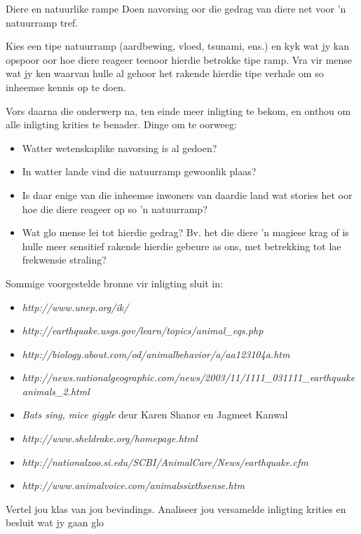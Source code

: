 \begin{project}{Diere en natuurlike rampe}
Doen navorsing oor die gedrag van diere net voor 'n natuurramp tref. \par 
Kies een tipe natuurramp (aardbewing, vloed, tsunami, ens.) en kyk wat jy kan opspoor oor hoe diere reageer teenoor hierdie betrokke tipe ramp. Vra vir mense wat jy ken waarvan hulle al gehoor het rakende hierdie tipe verhale om so inheemse kennis op te doen.\par 
Vors daarna die onderwerp na, ten einde meer inligting te bekom, en onthou om alle inligting krities te benader. Dinge om te oorweeg: \par 
\begin{itemize}[noitemsep]
    \item Watter wetenskaplike navorsing is al gedoen?   
    \item In watter lande vind die natuurramp gewoonlik plaas? 
    \item Is daar enige van die inheemse inwoners van daardie land wat stories het oor hoe die diere reageer op so 'n natuurramp?  
    \item Wat glo mense lei tot hierdie gedrag? Bv. het die diere 'n magiese krag of is hulle meer sensitief rakende hierdie gebeure as ons, met betrekking tot lae frekwensie straling? 
\end{itemize}
Sommige voorgestelde bronne vir inligting sluit in:
\begin{itemize}[noitemsep]
\item \textsl{http://www.unep.org/ik/}
\item \textsl{http://earthquake.usgs.gov/learn/topics/animal\_eqs.php}
\item \textsl{http://biology.about.com/od/animalbehavior/a/aa123104a.htm} 
\item \textsl{http://news.nationalgeographic.com/news/2003/11/1111\_031111\_earthquakeanimals\_2.html}
\item \textsl{Bats sing, mice giggle} deur Karen Shanor en Jagmeet Kanwal
\item \textsl{http://www.sheldrake.org/homepage.html}
\item \textsl{http://nationalzoo.si.edu/SCBI/AnimalCare/News/earthquake.cfm}
\item \textsl{http://www.animalvoice.com/animalssixthsense.htm}
\end{itemize}
        \label{m38779*id1164121076422} Vertel jou klas van jou bevindings. Analiseer jou versamelde inligting krities en besluit wat jy gaan glo\par 
      \label{m38779*cid9}
      \end{project}

